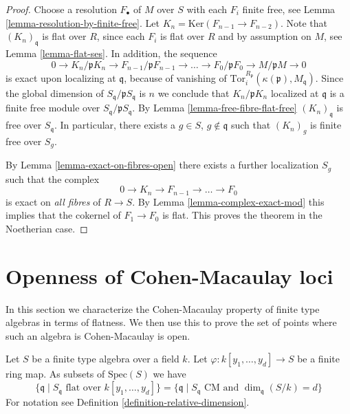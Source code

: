 \begin{proof}
\medskip\noindent
Choose a resolution $F_\bullet$ of $M$ over $S$ with each
$F_i$ finite free, see Lemma \ref{lemma-resolution-by-finite-free}.
Let $K_n = \text{Ker}(F_{n-1} \to F_{n-2})$. Note that
$(K_n)_{\mathfrak q}$ is flat over $R$, since each $F_i$
is flat over $R$ and by assumption on $M$, see Lemma
\ref{lemma-flat-ses}. In addition, the sequence
$$
0 \to
K_n/\mathfrak p K_n \to
F_{n-1}/ \mathfrak p F_{n-1} \to
\ldots \to
F_0 / \mathfrak p F_0 \to
M/\mathfrak p M \to
0
$$
is exact upon localizing at $\mathfrak q$, because of vanishing
of $\text{Tor}_i^{R_\mathfrak p}(\kappa(\mathfrak p), M_{\mathfrak q})$.
Since the global dimension of $S_\mathfrak q/\mathfrak p S_{\mathfrak q}$
is $n$ we conclude that $K_n / \mathfrak p K_n$ localized
at $\mathfrak q$ is a finite free module over 
$S_\mathfrak q/\mathfrak p S_{\mathfrak q}$. By
Lemma \ref{lemma-free-fibre-flat-free} $(K_n)_{\mathfrak q}$
is free over $S_{\mathfrak q}$. In particular, there exists a
$g \in S$, $g \not \in \mathfrak q$ such that $(K_n)_g$
is finite free over $S_g$.

\medskip\noindent
By Lemma \ref{lemma-exact-on-fibres-open}
there exists a further localization $S_g$ such that
the complex
$$
0 \to K_n \to F_{n-1} \to \ldots \to F_0
$$
is exact on {\it all fibres} of $R \to S$. By
Lemma \ref{lemma-complex-exact-mod}
this implies that the cokernel of $F_1 \to F_0$ is
flat. This proves the theorem in the Noetherian case.
\end{proof}










\section{Openness of Cohen-Macaulay loci}
\label{section-CM-open}

\noindent
In this section we characterize the Cohen-Macaulay property
of finite type algebras in terms of flatness. We then use this
to prove the set of points where such an algebra is Cohen-Macaulay
is open.

\begin{lemma}
\label{lemma-where-CM}
Let $S$ be a finite type algebra over a field $k$.
Let $\varphi : k[y_1, \ldots, y_d] \to S$ be a finite ring map.
As subsets of $\text{Spec}(S)$ we have
$$
\{ \mathfrak q \mid
S_{\mathfrak q} \text{ flat over }k[y_1, \ldots, y_d]\}
=
\{ \mathfrak q \mid
S_{\mathfrak q} \text{ CM and }\dim_{\mathfrak q}(S/k) = d\}
$$
For notation see Definition \ref{definition-relative-dimension}.
\end{lemma}

